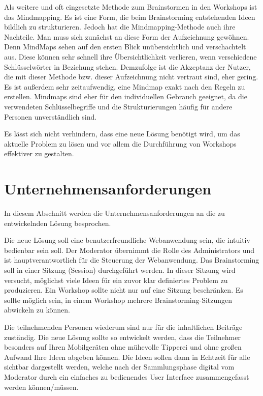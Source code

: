 Als weitere und oft eingesetzte Methode zum Brainstormen in den Workshops ist das Mindmapping. Es ist eine Form, die beim Brainstorming entstehenden Ideen bildlich zu strukturieren. Jedoch hat die Mindmapping-Methode auch ihre Nachteile. Man muss sich zunächst an diese Form der Aufzeichnung gewöhnen. Denn MindMaps sehen auf den ersten Blick unübersichtlich und verschachtelt aus. Diese können sehr schnell ihre Übersichtlichkeit verlieren, wenn verschiedene Schlüsselwörter in Beziehung stehen. Demzufolge ist die Akzeptanz der Nutzer, die mit dieser Methode bzw. dieser Aufzeichnung nicht vertraut sind, eher gering. Es ist außerdem sehr zeitaufwendig, eine Mindmap exakt nach den Regeln zu erstellen. Mindmaps sind eher für den individuellen Gebrauch geeignet, da die verwendeten Schlüsselbegriffe und die Strukturierungen häufig für andere Personen unverständlich sind.\bigskip

Es lässt sich nicht verhindern, dass eine neue Lösung benötigt wird, um das aktuelle Problem zu lösen und vor allem die Durchführung von Workshops effektiver zu gestalten.

\section{Unternehmensanforderungen}
\label{sec:unternehmensanforderungen}
In diesem Abschnitt werden die Unternehmensanforderungen an die zu entwickelnden Lösung besprochen.\bigskip

Die neue Lösung soll eine benutzerfreundliche Webanwendung sein, die intuitiv bedienbar sein soll. Der Moderator übernimmt die Rolle des Administrators und ist hauptverantwortlich für die Steuerung der Webanwendung. Das Brainstorming soll in einer Sitzung (Session) durchgeführt werden. In dieser Sitzung wird versucht, möglichst viele Ideen für ein zuvor klar definiertes Problem zu produzieren. Ein Workshop sollte nicht nur auf eine Sitzung beschränken. Es sollte möglich sein, in einem Workshop mehrere Brainstorming-Sitzungen abwickeln zu können.\bigskip

Die teilnehmenden Personen wiederum sind nur für die inhaltlichen Beiträge zuständig. Die neue Lösung sollte so entwickelt werden, dass die Teilnehmer besonders auf Ihren Mobilgeräten ohne mühevolle Tipperei und ohne großen Aufwand Ihre Ideen abgeben können. Die Ideen sollen dann in Echtzeit für alle sichtbar dargestellt werden, welche nach der Sammlungsphase digital vom Moderator durch ein einfaches zu bedienendes User Interface zusammengefasst werden können/müssen.\bigskip

